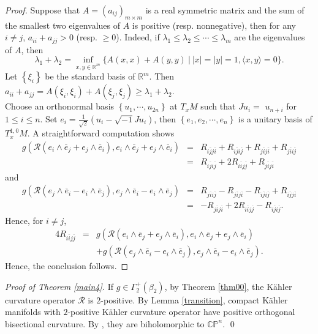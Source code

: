\documentclass[12pt]{amsart}
\theoremstyle{plain}
\theoremstyle{definition}
\newcommand{\bproof}{\begin{proof}}
\newcommand{\eproof}{\end{proof}}
\renewcommand{\bar}{\overline}
\newcommand{\ee}{\end{eqnarray*}}
\newcommand{\be}{\begin{eqnarray*}}
\renewcommand{\>}{\rightarrow}
\newcommand{\C}{{\mathbb C}}
\renewcommand{\P}{{\mathbb P}}
\numberwithin{equation}{section} %
\begin{document}
	\bproof  Suppose  that $A=\left(a_{i j}\right)_{m \times m}$ is a real symmetric matrix and the sum of the smallest two eigenvalues of $A$ is positive (resp. nonnegative), then  for any $i \neq j$,  $a_{i i}+a_{j j}>0$ (resp.  $\geq 0$). Indeed, if $\lambda_1 \leq \lambda_2 \leq \cdots \leq \lambda_m$ are the eigenvalues of $A$, then
	$$
\lambda_1+\lambda_2=\inf _{x, y \in \mathbb{R}^m}\{A(x, x)+A(y, y)\ |\ | x|=| y \mid=1,\langle x, y\rangle=0\}.$$
	Let $\left\{\xi_i\right\}$ be the standard basis of $\mathbb{R}^m$.  Then
	$a_{i i}+a_{j j}=A\left(\xi_i, \xi_i\right)+A\left(\xi_j, \xi_j\right) \geq \lambda_1+\lambda_2$.\\
	
	Choose an orthonormal basis $\left\{u_1,  \cdots, u_{2 n}\right\}$ at $T_x M$ such that $J u_i=$ $u_{n+i}$ for $1 \leq i \leq n$. Set $e_i=\frac{1}{\sqrt{2}}\left(u_i-\sqrt{-1} J u_i\right)$, then $\left\{e_1, e_2, \cdots, e_n\right\}$ is a unitary basis of $T_x^{1,0} M$.
	A straightforward computation shows
\be  g\left(\mathscr R\left(e_i \wedge \bar{e}_j+e_j \wedge \bar{e}_i\right), e_i \wedge \bar{e}_j+e_j \wedge \bar{e}_i\right) &=&R_{i \bar{j} j \bar{i}}+ R_{i \bar{j} i \bar{j}}+R_{j \bar{i} {j} \bar{i}}+R_{j \bar{i} i \bar{j}}\\& =& R_{i \bar{j} i \bar{j}}+2 R_{i\bar{i} {j} \bar{j}}+R_{j \bar{i} j \bar{i}}\ee 
	and
	\be 
	 g\left(\mathscr R\left( e_j \wedge \bar{e}_i- e_i \wedge \bar{e}_j\right),  e_j \wedge \bar{e}_i- e_i \wedge \bar{e}_j\right)&=& R_{j \bar{i}i \bar{j}}-R_{j \overline{i }j \bar{i}}-R_{i \bar{j} i \bar{j}} +R_{i \bar{j} {j} \bar{i}}\\
&	= & -R_{j \bar{i} {j} \bar{i}}+2 R_{i \bar{i} j \bar{j}}-R_{i \bar{j} i \bar{j}}.
\ee
Hence, for $i\neq j $,	
\be 4R_{i\bar i j \bar j}&=& g\left(\mathscr R\left(e_i \wedge \bar{e}_j+e_j \wedge \bar{e}_i\right), e_i \wedge \bar{e}_j+e_j \wedge \bar{e}_i\right)\\&&+ g\left(\mathscr R\left(e_j \wedge \bar{e}_i- e_i \wedge \bar{e}_j\right),  e_j \wedge \bar{e}_i- e_i \wedge \bar{e}_j\right). \ee
	Hence, the conclusion follows.
	\eproof 

	
	\noindent \emph{Proof of Theorem \ref{main4}.} If $g\in \Gamma_2^+(\beta_2)$, by Theorem \ref{thm00}, the K\"ahler curvature operator $\mathscr R$  is $2$-positive. By Lemma \ref{transition}, compact  Kähler manifolds with $2$-positive K\"ahler curvature operator have positive
	orthogonal bisectional curvature. By  \cite{GuZhang2010},   they are biholomorphic to $\C\P^n$. \qed 
	
\end{document}
